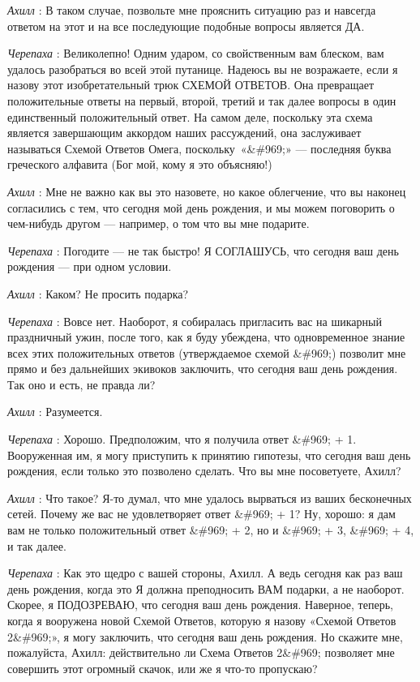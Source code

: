 \documentclass[../main.tex]{subfiles}
\begin{document}
\begin{dialogue}
\emph{Ахилл} : В таком случае, позвольте мне прояснить ситуацию раз и навсегда ответом на этот и на все последующие подобные вопросы является ДА.

\emph{Черепаха} : Великолепно! Одним ударом, со свойственным вам блеском, вам удалось разобраться во всей этой путанице. Надеюсь вы не возражаете, если я назову этот изобретательный трюк СХЕМОЙ ОТВЕТОВ. Она превращает положительные ответы на первый, второй, третий и так далее вопросы в один единственный положительный ответ. На самом деле, поскольку эта схема является завершающим аккордом наших рассуждений, она заслуживает называться Схемой Ответов Омега, поскольку~«\&\#969;» --- последняя буква греческого алфавита (Бог мой, кому я это объясняю!)

\emph{Ахилл} : Мне не важно как вы это назовете, но какое облегчение, что вы наконец согласились с тем, что сегодня мой день рождения, и мы можем поговорить о чем-нибудь другом --- например, о том что вы мне подарите.

\emph{Черепаха} : Погодите --- не так быстро! Я СОГЛАШУСЬ, что сегодня ваш день рождения --- при одном условии.

\emph{Ахилл} : Каком? Не просить подарка?

\emph{Черепаха} : Вовсе нет. Наоборот, я собиралась пригласить вас на шикарный праздничный ужин, после того, как я буду убеждена, что одновременное знание всех этих положительных ответов (утверждаемое схемой \&\#969;) позволит мне прямо и без дальнейших экивоков заключить, что сегодня ваш день рождения. Так оно и есть, не правда ли?

\emph{Ахилл} : Разумеется.

\emph{Черепаха} : Хорошо. Предположим, что я получила ответ \&\#969; + 1. Вооруженная им, я могу приступить к принятию гипотезы, что сегодня ваш день рождения, если только это позволено сделать. Что вы мне посоветуете, Ахилл?

\emph{Ахилл} : Что такое? Я-то думал, что мне удалось вырваться из ваших бесконечных сетей. Почему же вас не удовлетворяет ответ \&\#969; + 1? Ну, хорошо: я дам вам не только положительный ответ \&\#969; + 2, но и \&\#969; + 3, \&\#969; + 4, и так далее.

\emph{Черепаха} : Как это щедро с вашей стороны, Ахилл. А ведь сегодня как раз ваш день рождения, когда это Я должна преподносить ВАМ подарки, а не наоборот. Скорее, я ПОДОЗРЕВАЮ, что сегодня ваш день рождения. Наверное, теперь, когда я вооружена новой Схемой Ответов, которую я назову «Схемой Ответов 2\&\#969;», я могу заключить, что сегодня ваш день рождения. Но скажите мне, пожалуйста, Ахилл: действительно ли Схема Ответов 2\&\#969; позволяет мне совершить этот огромный скачок, или же я что-то пропускаю?


\end{dialogue}
\end{document}
